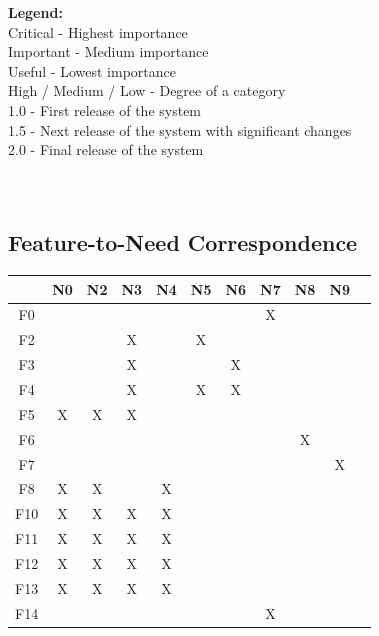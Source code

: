 \documentclass{article}
\begin{document}
\textbf{Legend:} \\
Critical - Highest importance \\
Important - Medium importance \\
Useful - Lowest importance \\
High / Medium / Low - Degree of a category \\
1.0 - First release of the system \\
1.5 - Next release of the system with significant changes \\
2.0 - Final release of the system \\
~\\
~\\
\subsection{Feature-to-Need Correspondence}
\begin{tabular}{ | c || c | c | c | c | c | c | c | c | c | c | }
\hline
    & N0 & N2 & N3 & N4 & N5 & N6 & N7 & N8 & N9 \\
\hline
\hline
F0  &    &    &    &    &    &    & X  &    &    \\
\hline
F2  &    &    & X  &    & X  &    &    &    &    \\
\hline
F3  &    &    & X  &    &    & X  &    &    &    \\
\hline
F4  &    &    & X  &    & X  & X  &    &    &    \\
\hline
F5  & X  & X  & X  &    &    &    &    &    &    \\
\hline
F6  &    &    &    &    &    &    &    & X  &    \\
\hline
F7  &    &    &    &    &    &    &    &    & X  \\
\hline
F8  & X  & X  &    & X  &    &    &    &    &    \\
\hline
F10 & X  & X  & X  & X  &    &    &    &    &    \\
\hline
F11 & X  & X  & X  & X  &    &    &    &    &    \\
\hline
F12 & X  & X  & X  & X  &    &    &    &    &    \\
\hline
F13 & X  & X  & X  & X  &    &    &    &    &    \\
\hline
F14 &    &    &    &    &    &    & X  &    &    \\
\hline
\end{tabular}
\end{document}
